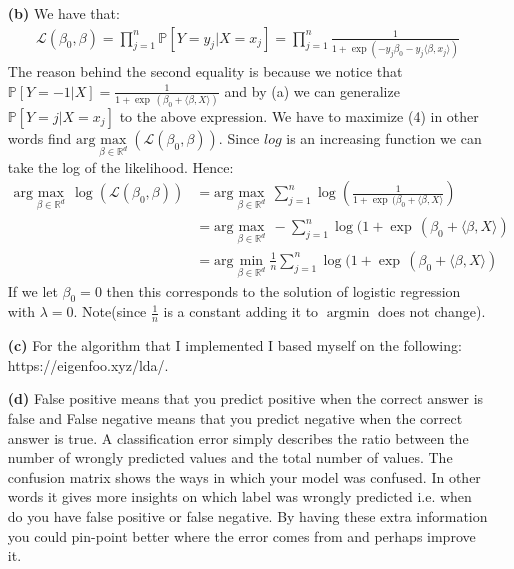 \documentclass[10pt,a4paper]{article}
\begin{document}
\begin{enumerate}
\item[\textbf{(b)}] We have that:
\begin{align}
\mathcal{L}(\beta_0 , \beta) = \prod ^n _{j=1} \mathbb{P}[Y = y_j | X = x_j] = \prod ^n_{j=1} \frac{1}{1+\exp (-y_j \beta_0 - y_j \langle \beta, x_j \rangle)}
\end{align}
The reason behind the second equality is because we notice that $\mathbb{P}[Y = -1 | X] =\frac{1}{1+ \exp \,(\beta_0 + \langle \beta, X \rangle )} $ and by (a) we can generalize $\mathbb{P}[Y = j | X = x_j]$ to the above expression. We have to maximize (4) in other words find ${\text{arg}}\max\limits_{\beta \in \mathbb{R}^d}(\mathcal{L}(\beta_0, \beta))$. Since $log$ is an increasing function we can take the log of the likelihood. Hence:
\begin{align*}
{\text{arg}}\max\limits_{\beta \in \mathbb{R}^d}\,\log(\mathcal{L}(\beta_0, \beta)) &= {\text{arg}}\max\limits_{\beta \in \mathbb{R}^d} \, \sum^{n}_{j=1} \log(\frac{1}{1+ \exp \,(\beta_0 + \langle \beta, X \rangle })\\
& = {\text{arg}}\max\limits_{\beta \in \mathbb{R}^d} \, - \sum^{n}_{j=1} \log(1+ \exp \,(\beta_0 + \langle \beta, X \rangle )\\
&= {\text{arg}}\min\limits_{\beta \in \mathbb{R}^d} \frac{1}{n}\sum^{n}_{j=1} \log(1+ \exp \,(\beta_0 + \langle \beta, X \rangle )\
\end{align*} 
If we let $\beta_0 = 0$ then this corresponds to the solution of logistic regression with $\lambda = 0$. Note(since $\frac{1}{n}$ is a constant adding it to ${\text{arg}}\min$ does not change). 

\item[\textbf{(c)}]
For the algorithm that I implemented I based myself on the following: https://eigenfoo.xyz/lda/.


\item[\textbf{(d)}]  False positive means that you predict positive when the correct answer is false and False negative means that you predict negative when the correct answer is true. A classification error simply describes the ratio between the number of wrongly predicted values and the total number of values. The confusion matrix shows the ways in which your model was confused. In other words it gives more insights on which label was wrongly predicted i.e. when do you have false positive or false negative. By having these extra information you could pin-point better where the error comes from and perhaps improve it.
\end{enumerate}
\end{document}

